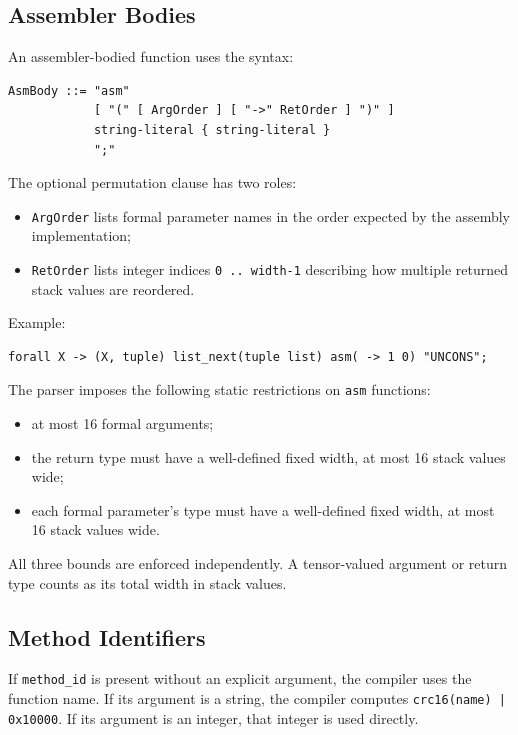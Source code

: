 \documentclass[12pt,oneside]{article}
\begin{document}
\subsection{Assembler Bodies}
\label{sec:asm-bodies}
An assembler-bodied function uses the syntax:

\begin{verbatim}
AsmBody ::= "asm"
            [ "(" [ ArgOrder ] [ "->" RetOrder ] ")" ]
            string-literal { string-literal }
            ";"
\end{verbatim}

The optional permutation clause has two roles:

\begin{itemize}
\item \verb|ArgOrder| lists formal parameter names in the order expected by the
assembly implementation;
\item \verb|RetOrder| lists integer indices \verb|0 .. width-1| describing how
multiple returned stack values are reordered.
\end{itemize}

Example:

\begin{verbatim}
forall X -> (X, tuple) list_next(tuple list) asm( -> 1 0) "UNCONS";
\end{verbatim}

The parser imposes the following static restrictions on \verb|asm| functions:

\begin{itemize}
\item at most 16 formal arguments;
\item the return type must have a well-defined fixed width, at most 16 stack
values wide;
\item each formal parameter's type must have a well-defined fixed width, at
most 16 stack values wide.
\end{itemize}

All three bounds are enforced independently. A tensor-valued argument or
return type counts as its total width in stack values.

\subsection{Method Identifiers}
If \verb|method_id| is present without an explicit argument, the compiler uses
the function name. If its argument is a string, the compiler computes
\texttt{crc16(name) | 0x10000}. If its argument is an integer, that integer is
used directly.
\end{document}
